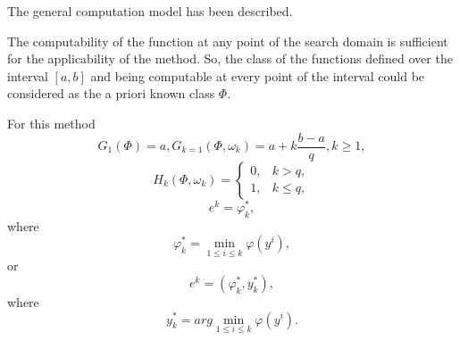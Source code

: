 The general computation model has been described. 


The computability of the function at any point of the search domain is sufficient for the applicability of the method. So, the class of the functions defined over the interval $[a,b]$ and being computable at every point of the interval could be considered as the a priori known class $\Phi$. 

For this method
\begin{displaymath}
G_1(\Phi)=a, G_{k=1}(\Phi,\omega_k)=a+k\frac{b-a}{q}, k\geq 1,
\end{displaymath}
\begin{displaymath}
  H_k(\Phi,\omega_k) =
  \begin{cases}
    0, & k > q, \\
    1, & k \leq q,
  \end{cases}
\end{displaymath}
\begin{equation}
\label{eq:18}
e^k=\varphi_k^*,
\end{equation}
where
\begin{equation}
\label{eq:19}
\varphi_k^*=\min_{1\leq i\leq k} \varphi(y^i),
\end{equation}
or
\begin{displaymath}
e^k=(\varphi_k^*,y_k^*),
\end{displaymath}
where 
\begin{displaymath}
\label{eq:19}
y_k^*=arg\min_{1\leq i\leq k} \varphi(y^i).
\end{displaymath}


